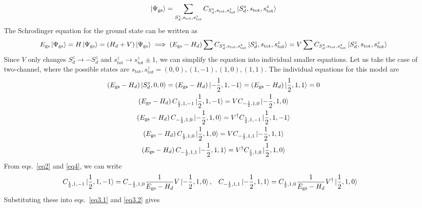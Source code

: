 \documentclass{revtex4-2}
\begin{document}
\begin{align}
	\label{gstate_Expand}
\ket{\Psi_\text{gs}} = \sum_{S_d^z, s_\text{tot},s_\text{tot}^z}C_{S_d^z, s_\text{tot},s_\text{tot}^z}\ket{S_d^z, s_\text{tot}, s_\text{tot}^z}
\end{align}
The Schrodinger equation for the ground state can be written as
\begin{align}
	E_\text{gs}\ket{\Psi_\text{gs}} = H \ket{\Psi_\text{gs}} = \left(H_d + V\right)\ket{\Psi_\text{gs}} \implies \left(E_\text{gs} - H_d\right)\sum C_{S_d^z, s_\text{tot},s_\text{tot}^z}\ket{S_d^z, s_\text{tot}, s_\text{tot}^z} = V\sum C_{S_d^z, s_\text{tot},s_\text{tot}^z}\ket{S_d^z, s_\text{tot}, s_\text{tot}^z}
\end{align}
Since \(V\) only changes \(S_d^z \to -S_d^z\) and \(s^z_\text{tot} \to s^z_\text{tot} \pm 1\), we can simplify the equation into individual smaller equations. Let us take the case of two-channel, where the possible states are \(s_\text{tot},s^z_\text{tot} = (0,0), (1,-1), (1,0), (1,1)\). The individual equations for this model are
\begin{gather}
	\left(E_\text{gs} - H_d\right) \ket{S_d^z, 0, 0} = \left(E_\text{gs} - H_d\right) \ket{-\frac{1}{2}, 1, -1} = \left(E_\text{gs} - H_d\right) \ket{\frac{1}{2}, 1, 1}  = 0 \label{no_V}\\
	\left(E_\text{gs} - H_d\right) C_{\frac{1}{2}, 1, -1}\ket{\frac{1}{2}, 1, -1} = V C_{-\frac{1}{2}, 1, 0}\ket{-\frac{1}{2}, 1, 0}\label{eq2}\\
	\left(E_\text{gs} - H_d\right) C_{-\frac{1}{2}, 1, 0}\ket{-\frac{1}{2}, 1, 0} = V^\dagger C_{\frac{1}{2}, 1, -1}\ket{\frac{1}{2}, 1, -1}\label{eq3.2}\\
	\left(E_\text{gs} - H_d\right) C_{\frac{1}{2}, 1, 0}\ket{\frac{1}{2}, 1, 0} = V C_{-\frac{1}{2}, 1, 1}\ket{-\frac{1}{2}, 1, 1} \label{eq3.1}\\
	\left(E_\text{gs} - H_d\right) C_{-\frac{1}{2}, 1, 1}\ket{-\frac{1}{2}, 1, 1} = V^\dagger C_{\frac{1}{2}, 1, 0}\ket{\frac{1}{2}, 1, 0}\label{eq4}
\end{gather}
From eqs.~\ref{eq2} and \ref{eq4}, we can write
\begin{align}
	C_{\frac{1}{2}, 1, -1}\ket{\frac{1}{2}, 1, -1} &= C_{-\frac{1}{2}, 1, 0}\frac{1}{E_\text{gs} - H_d}V \ket{-\frac{1}{2}, 1, 0}, &&C_{-\frac{1}{2}, 1, 1}\ket{-\frac{1}{2}, 1, 1} = C_{\frac{1}{2}, 1, 0}\frac{1}{E_\text{gs} - H_d}V^\dagger \ket{\frac{1}{2}, 1, 0}
\end{align}
Substituting these into eqs.~\ref{eq3.1} and \ref{eq3.2} gives 
\end{document}
